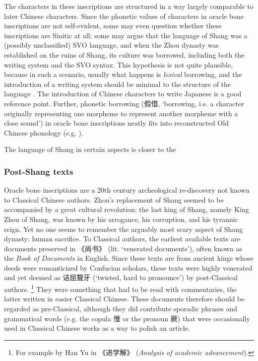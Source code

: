 \documentclass[UTF8, a4paper, oneside, scheme=plain, 12pt]{ctexrep}
\newcommand*{\citepage}[1]{p.~{#1}}
\newcommand*{\citepages}[1]{pp.~{#1}}
\newcommand{\work}[1]{\textit{#1}}
\newcommand{\translate}[1]{`#1'}
\begin{document}
The characters in these inscriptions are structured in a way largely comparable to later Chinese characters.
Since the phonetic values of characters in oracle bone inscriptions are not self-evident,
some may even question whether these inscriptions are Sinitic at all:
some may argue that the language of Shang was a (possibly unclassified) SVO language,
and when the Zhou dynasty was established on the ruins of Shang,
its culture was borrowed, including both the writing system and the SVO syntax.
This hypothesis is not quite plausible, because in such a scenario, usually what happens is \emph{lexical} borrowing,
and the introduction of a writing system should be minimal to the structure of the language
\citep[\citepage{88}]{delancey2013origins}.
The introduction of Chinese characters to write Japanese is a good reference point.
Further, phonetic borrowing (假借, \translate{borrowing, i.e. a character originally representing one morpheme to represent another morpheme with a close sound}) in oracle bone inscriptions
neatly fits into reconstructed Old Chinese phonology
(e.g. \citealt[\citepages{115}]{baxter2014old}).

The language of Shang in certain aspects is closer to the  

\subsubsection{Post-Shang texts}\label{sec:intro.pre-classical.post-shang}

Oracle bone inscriptions are 
a 20th century archeological re-discovery not known to Classical Chinese authors.
Zhou's replacement of Shang seemed to be accompanied by a great cultural revolution:
the last king of Shang, namely King Zhou of Shang, was known by 
his arrogance, his corruption, and his tyrannic reign.
Yet no one seems to remember the arguably most scary aspect of Shang dynasty: human sacrifice.
To Classical authors, the earliest available texts are 
documents preserved in 《尚书》 (lit. \translate{venerated documents}),
often known as the \work{Book of Documents} in English.
Since these texts are from ancient kings 
whose deeds were romanticized by Confucian scholars,
these texts were highly venerated and yet deemed as
诘屈聱牙 (\translate{twisted, hard to pronounce})
by post-Classical authors.%
\footnote{
    For example by Han Yu in 《进学解》 (\work{Analysis of academic advancement}).
}
They were something that had to be read with commentaries,
the latter written in easier Classical Chinese.
These documents therefore should be regarded as pre-Classical,
although they did contribute sporadic phrases
and grammatical words (e.g. the copula 惟 or the pronoun 厥)
that were occasionally used in Classical Chinese works as a way to polish an article.
\end{document}
